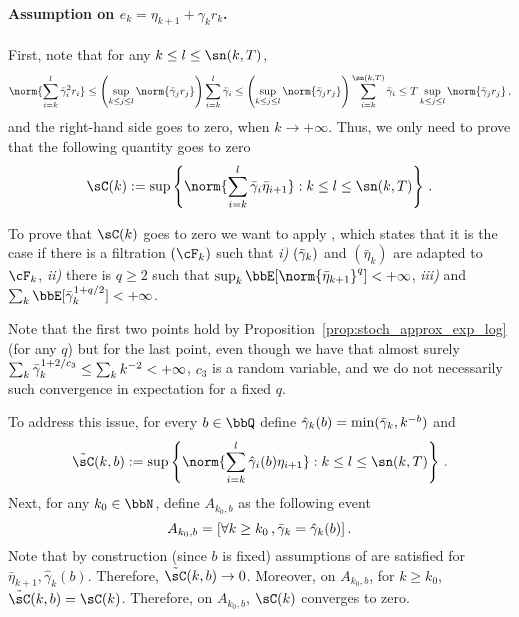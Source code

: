   \paragraph{Assumption on $e_k = \eta_{k+1} + \gamma_k r_k$.} First, note that for any $k\leq l \leq \sn(k,T)$,
  \begin{equation*}
    \norm{\sum_{i=k}^l \bgamma_i^2 r_i} \leq \left(\sup_{k \leq j \leq l} \norm{\bgamma_j r_j}\right)\sum_{i=k}^l \bgamma_i \leq \left(\sup_{k \leq j \leq l} \norm{\bgamma_j r_j}\right)\sum_{i=k}^{\sn(k,T)} \bgamma_i \leq T \sup_{k \leq j \leq l} \norm{\bgamma_j r_j}\, ,
  \end{equation*}
and the right-hand side goes to zero, when $k \rightarrow + \infty$. Thus, we only need to prove that the following quantity goes to zero
\begin{equation*}
 \sC(k):= \sup\left\{ \norm{\sum_{i=k}^l \bgamma_i \bar{\eta}_{i+1}} : k \leq l \leq \sn(k,T)\right\} \, .
\end{equation*}

To prove that $\sC(k)$ goes to zero we want to apply \cite[Proposition 4.2, Remarks 4.3]{benaim2006dynamics}, which states that it is the case if there is a filtration $(\cF_k)$ such that \emph{i)} $(\bar{\gamma}_k)$ and $(\bar{\eta}_{k})$ are adapted to $\cF_k$, \emph{ii)} there is $q \geq 2$ such that $\sup_{k} \bbE[\norm{\bar{\eta}_{k+1}}^q] < + \infty$, \emph{iii)} and $\sum_{k} \bbE[\bgamma_k^{1+q/2}] <  +\infty$.

Note that the first two points hold by Proposition~\ref{prop:stoch_approx_exp_log} (for any $q$) but for the last point, even though we have that almost surely $\sum_{k}\bar{\gamma}_k^{1 + 2/c_3} \leq \sum_{k} k^{-2} < + \infty$, $c_3$ is a random variable, and we do not necessarily such convergence in expectation for a fixed $q$. 

To address this issue, for every $b \in \bbQ$ define $\hat{\gamma}_k(b) = \min(\bar{\gamma}_k, k^{-b})$ and 
\begin{equation*}
  \tilde{\sC}(k,b):= \sup\left\{ \norm{\sum_{i=k}^l \hat{\gamma}_i(b)\eta_{i+1}} : k \leq l \leq \sn(k,T)\right\} \, .
 \end{equation*}
Next, for any $k_0 \in \bbN$, define $A_{k_0, b}$ as the following event 
\begin{equation*}
  A_{k_0, b} = [\forall k \geq k_0\, , \bar{\gamma}_k = \hat{\gamma}_k(b)]\, .
\end{equation*}
Note that by construction (since $b$ is fixed) assumptions of \cite[Proposition 4.2, Remarks 4.3]{benaim2006dynamics} are satisfied for $\bar{\eta}_{k+1},\hat{\gamma}_k(b)$. Therefore, $ \tilde{\sC}(k,b) \rightarrow 0$. Moreover, on $A_{k_0, b}$, for $k \geq k_0$, $\tilde{\sC}(k,b) = \sC(k)$. Therefore, on $A_{k_0, b}$, $\sC(k)$ converges to zero.

